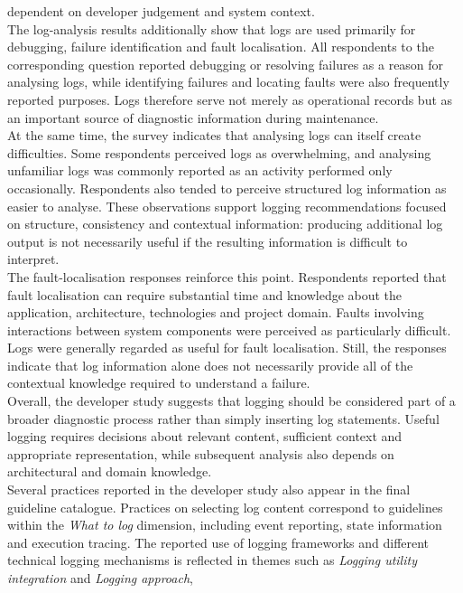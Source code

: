 dependent on developer judgement and system context.
\\
The log-analysis results additionally show that logs are used primarily for debugging, 
failure identification and fault localisation. All respondents to the corresponding 
question reported debugging or resolving failures as a reason for analysing logs, 
while identifying failures and locating faults were also frequently reported purposes. 
Logs therefore serve not merely as operational records but as an important source of 
diagnostic information during maintenance.
\\
At the same time, the survey indicates that analysing logs can itself create difficulties.
Some respondents perceived logs as overwhelming, and analysing unfamiliar logs was commonly 
reported as an activity performed only occasionally. Respondents also tended to perceive 
structured log information as easier to analyse. These observations support logging 
recommendations focused on structure, consistency and contextual information: 
producing additional log output is not necessarily useful if the resulting information is difficult to interpret.
\\
The fault-localisation responses reinforce this point. Respondents reported that 
fault localisation can require substantial time and knowledge about the application, 
architecture, technologies and project domain. Faults involving interactions between 
system components were perceived as particularly difficult. Logs were generally regarded 
as useful for fault localisation. Still, the responses indicate that log information alone 
does not necessarily provide all of the contextual knowledge required to understand a failure.
\\
Overall, the developer study suggests that logging should be considered part of a broader 
diagnostic process rather than simply inserting log statements. Useful logging requires 
decisions about relevant content, sufficient context and appropriate representation, 
while subsequent analysis also depends on architectural and domain knowledge.
\\
Several practices reported in the developer study also appear in the final 
guideline catalogue. Practices on selecting log content correspond to guidelines 
within the \textit{What to log} dimension, including event reporting, state information and execution tracing.
The reported use of logging frameworks and different technical logging mechanisms 
is reflected in themes such as \textit{Logging utility integration} and \textit{Logging approach}, 
